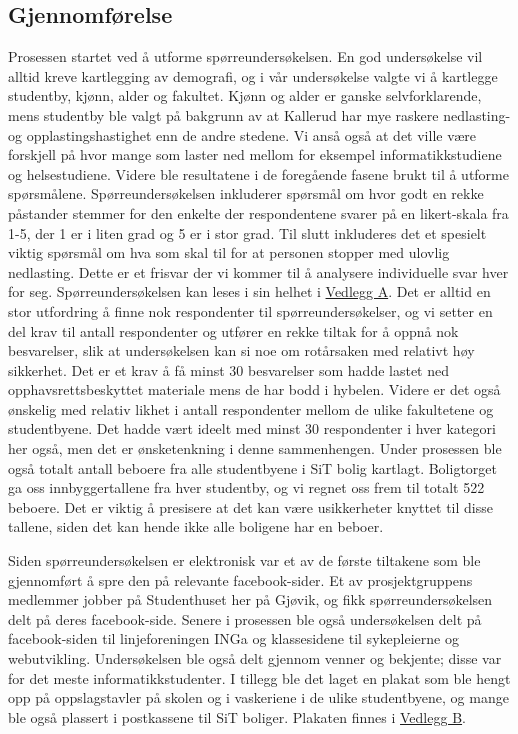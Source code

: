 \subsection{Gjennomførelse}
Prosessen startet ved å utforme spørreundersøkelsen. En god undersøkelse vil alltid kreve kartlegging av demografi, og i vår undersøkelse valgte vi å kartlegge studentby, kjønn, alder og fakultet. Kjønn og alder er ganske selvforklarende, mens studentby ble valgt på bakgrunn av at Kallerud har mye raskere nedlasting- og opplastingshastighet enn de andre stedene. Vi anså også at det ville være forskjell på hvor mange som laster ned mellom for eksempel informatikkstudiene og helsestudiene. Videre ble resultatene i de foregående fasene brukt til å utforme spørsmålene. Spørreundersøkelsen inkluderer spørsmål om hvor godt en rekke påstander stemmer for den enkelte der respondentene svarer på en likert-skala fra 1-5, der 1 er i liten grad og 5 er i stor grad. Til slutt inkluderes det et spesielt viktig spørsmål om hva som skal til for at personen stopper med ulovlig nedlasting. Dette er et frisvar der vi kommer til å analysere individuelle svar hver for seg. Spørreundersøkelsen kan leses i sin helhet i \hyperref[undersokelse]{Vedlegg A}.
\newline
Det er alltid en stor utfordring å finne nok respondenter til spørreundersøkelser, og vi setter en del krav til antall respondenter og utfører en rekke tiltak for å oppnå nok besvarelser, slik at undersøkelsen kan si noe om rotårsaken med relativt høy sikkerhet. Det er et krav å få minst 30 besvarelser som hadde lastet ned opphavsrettsbeskyttet materiale mens de har bodd i hybelen. Videre er det også ønskelig med relativ likhet i antall respondenter mellom de ulike fakultetene og studentbyene. Det hadde vært ideelt med minst 30 respondenter i hver kategori her også, men det er ønsketenkning i denne sammenhengen. Under prosessen ble også totalt antall beboere fra alle studentbyene i SiT bolig kartlagt. Boligtorget ga oss innbyggertallene fra hver studentby, og vi regnet oss frem til totalt 522 beboere. Det er viktig å presisere at det kan være usikkerheter knyttet til disse tallene, siden det kan hende ikke alle boligene har en beboer.

Siden spørreundersøkelsen er elektronisk var et av de første tiltakene som ble gjennomført å spre den på relevante facebook-sider. Et av prosjektgruppens medlemmer jobber på Studenthuset her på Gjøvik, og fikk spørreundersøkelsen delt på deres facebook-side. Senere i prosessen ble også undersøkelsen delt på facebook-siden til linjeforeningen INGa og klassesidene til sykepleierne og webutvikling. Undersøkelsen ble også delt gjennom venner og bekjente; disse var for det meste informatikkstudenter. I tillegg ble det laget en plakat som ble hengt opp på oppslagstavler på skolen og i vaskeriene i de ulike studentbyene, og mange ble også plassert i postkassene til SiT boliger. Plakaten finnes i \hyperref[plakat]{Vedlegg B}. 

